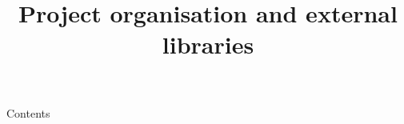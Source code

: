 
\newcommand{\topic}{
	Project organisation and external libraries
}

\title{\topic}
\supertitle{\course}
\date{}



\maketitle

\begin{frame}{Contents}
	\tableofcontents
\end{frame}



